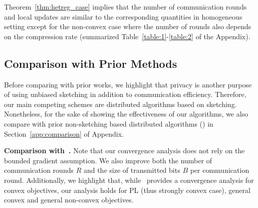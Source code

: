 \documentclass{article} %
\begin{document}

Theorem~\ref{thm:hetreg_case} implies that the number of communication rounds and local updates are similar to the corresponding quantities in homogeneous setting except for the non-convex case where the number of  rounds also depends on the compression rate (summarized Table~\ref{table:1}-\ref{table:2} of the Appendix).


\vspace{-0.05in}
\subsection{Comparison with Prior Methods} 

Before comparing with prior works, we highlight that privacy is another purpose of using unbiased sketching in addition to communication efficiency. 
Therefore, our main competing schemes are distributed algorithms based on sketching. 
Nonetheless, for the sake of showing the effectiveness of our algorithms, we also compare with prior non-sketching based distributed algorithms (\cite{karimireddy2019scaffold,basu2019qsparse,reisizadeh2020fedpaq,haddadpour2020federated}) in Section~\ref{app:comparison} of Appendix.


\noindent\textbf{Comparison with~\cite{li2019privacy}.} Note that our convergence analysis does not rely on the bounded gradient assumption. We also improve both the number of communication rounds $R$ and the size of transmitted bits $B$ per communication round. 
Additionally, we highlight that, while~\citep{li2019privacy} provides a convergence analysis for convex objectives, our analysis holds for PL (thus strongly convex case), general convex and general non-convex objectives.
\end{document}
